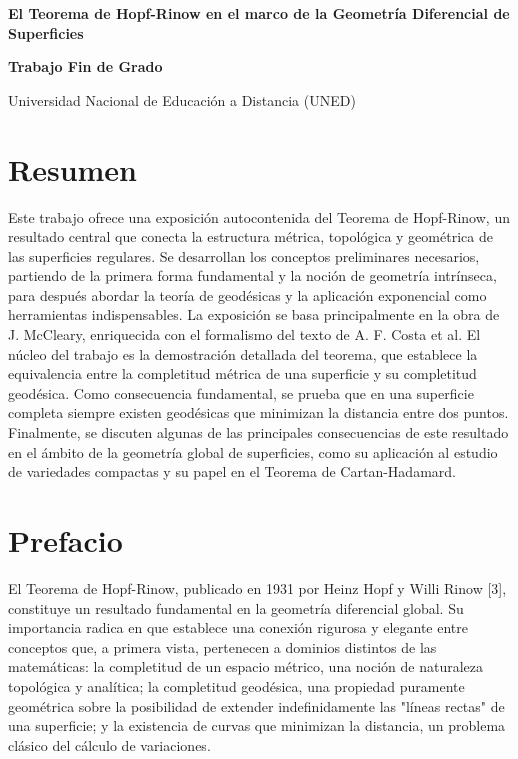 \documentclass[12pt, a4paper]{report}
\theoremstyle{miestilo}
\theoremstyle{midefinicion}
\begin{document}
\onehalfspacing

\begin{titlepage}
    \centering
    \vspace*{1cm}
    {\Huge\bfseries\color{DarkRed} El Teorema de Hopf-Rinow en el marco de la Geometría Diferencial de Superficies}
    \vfill
    \begin{center}
        \Large\textbf{Trabajo Fin de Grado}
    \end{center}
    \vfill
    {\large Universidad Nacional de Educación a Distancia (UNED)}
    \vspace{2cm}
\end{titlepage}

\chapter*{Resumen}

\noindent Este trabajo ofrece una exposición autocontenida del Teorema de Hopf-Rinow, un resultado central que conecta la estructura métrica, topológica y geométrica de las superficies regulares. Se desarrollan los conceptos preliminares necesarios, partiendo de la primera forma fundamental y la noción de geometría intrínseca, para después abordar la teoría de geodésicas y la aplicación exponencial como herramientas indispensables. La exposición se basa principalmente en la obra de J. McCleary, enriquecida con el formalismo del texto de A. F. Costa et al. El núcleo del trabajo es la demostración detallada del teorema, que establece la equivalencia entre la completitud métrica de una superficie y su completitud geodésica. Como consecuencia fundamental, se prueba que en una superficie completa siempre existen geodésicas que minimizan la distancia entre dos puntos. Finalmente, se discuten algunas de las principales consecuencias de este resultado en el ámbito de la geometría global de superficies, como su aplicación al estudio de variedades compactas y su papel en el Teorema de Cartan-Hadamard.

\tableofcontents

\chapter*{Prefacio}

El Teorema de Hopf-Rinow, publicado en 1931 por Heinz Hopf y Willi Rinow [3], constituye un resultado fundamental en la geometría diferencial global. Su importancia radica en que establece una conexión rigurosa y elegante entre conceptos que, a primera vista, pertenecen a dominios distintos de las matemáticas: la completitud de un espacio métrico, una noción de naturaleza topológica y analítica; la completitud geodésica, una propiedad puramente geométrica sobre la posibilidad de extender indefinidamente las "líneas rectas" de una superficie; y la existencia de curvas que minimizan la distancia, un problema clásico del cálculo de variaciones.
\end{document}
